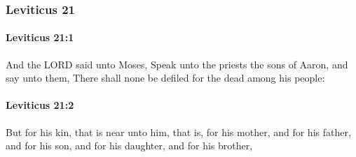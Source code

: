 	\subsubsection{Leviticus 21} %
		\label{LEVITICUS-21}

		\paragraph{Leviticus 21:1} %
			\label{LEVITICUS-21-1}

			And the LORD said unto Moses, Speak unto the priests the sons of Aaron, and say unto them, There shall none be defiled for the dead among his people:


		\paragraph{Leviticus 21:2} %
			\label{LEVITICUS-21-2}

			But for his kin, that is near unto him, that is, for his mother, and for his father, and for his son, and for his daughter, and for his brother,

